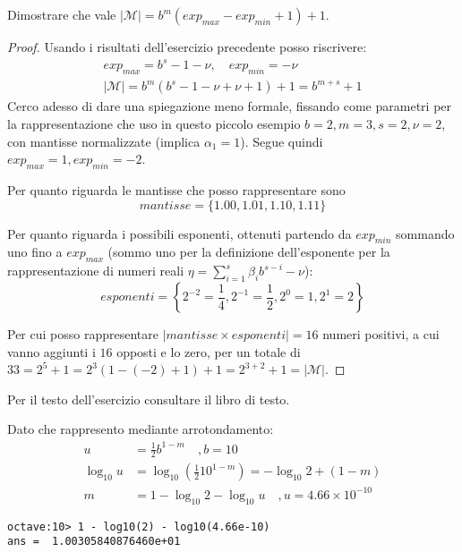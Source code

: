 \begin{exercise}
Dimostrare che vale $|\mathcal{M}| = b^{m}(exp_{max} - exp_{min} + 1) + 1$.
\end{exercise}
\begin{proof}
Usando i risultati dell'esercizio precedente posso riscrivere:
\begin{displaymath}
\begin{split}
	exp_{max} = b^{s} - 1 - \nu, \quad exp_{min} = -\nu \\
	|\mathcal{M}| = b^{m}(b^{s} - 1 - \nu + \nu + 1) + 1 = b^{m+s} + 1
\end{split}
\end{displaymath}
Cerco adesso di dare una spiegazione meno formale, fissando come parametri per
la rappresentazione che uso in questo piccolo esempio $b = 2, m = 3, s = 2, \nu = 2$,
con mantisse normalizzate (implica $\alpha_{1} = 1$).
Segue quindi $exp_{max} = 1, exp_{min} = -2$. 

Per quanto riguarda le mantisse che posso rappresentare sono 
$$mantisse = \lbrace 1.00, 1.01, 1.10, 1.11 \rbrace$$

Per quanto riguarda i possibili esponenti, ottenuti partendo da $exp_{min}$ sommando
uno fino a $exp_{max}$ (sommo uno per la definizione dell'esponente per la rappresentazione
di numeri reali $\eta = \sum_{i = 1}^{s}{\beta_{i} b^{s - i}} -\nu$):
$$esponenti = \left \lbrace 2^{-2} = \frac{1}{4}, 2^{-1} = \frac{1}{2},
		2^{0} = 1, 2^{1} = 2 \right \rbrace$$

Per cui posso rappresentare $|mantisse \times esponenti| = 16$ numeri positivi, 
a cui vanno aggiunti i $16$ opposti e lo zero, per un totale di $33 = 2^{5} + 1
= 2^{3}(1-(-2)+1)+1=2^{3+2}+1=|\mathcal{M}|$.
\end{proof}

\begin{exercise}[1.8]
Per il testo dell'esercizio consultare il libro di testo.
\end{exercise}
Dato che rappresento mediante arrotondamento:
\begin{displaymath}
\begin{split}
u &= \frac{1}{2}b^{1-m} \quad , b = 10 \\
\log_{10}{u} &= \log_{10}{\left ( \frac{1}{2}10^{1-m} \right )} = -\log_{10}{2} + (1 - m) \\
m &= 1 - \log_{10}{2} - \log_{10}{u} \quad , u = 4.66 \times 10^{-10}
\end{split}
\end{displaymath}
\begin{lstlisting}
octave:10> 1 - log10(2) - log10(4.66e-10)
ans =  1.00305840876460e+01
\end{lstlisting}

